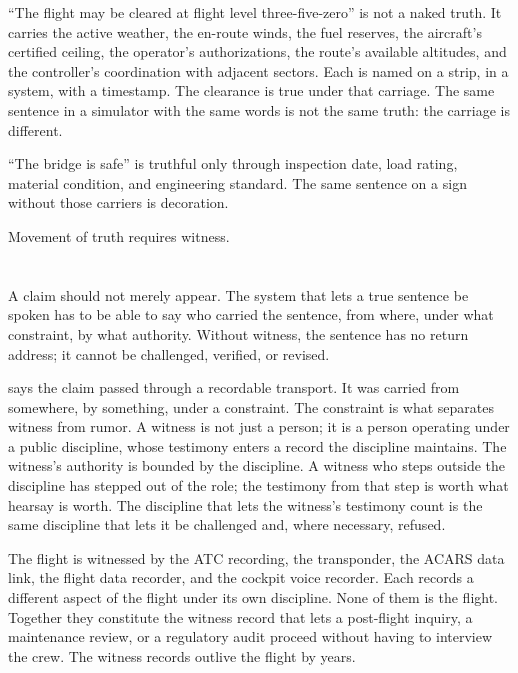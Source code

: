 ``The flight may be cleared at flight level three-five-zero'' is not a
naked truth. It carries the active weather, the en-route winds, the
fuel reserves, the aircraft's certified ceiling, the operator's
authorizations, the route's available altitudes, and the controller's
coordination with adjacent sectors. Each is named on a strip, in a
system, with a timestamp. The clearance is true under that carriage.
The same sentence in a simulator with the same words is not the same
truth: the carriage is different.

``The bridge is safe'' is truthful only through inspection date, load
rating, material condition, and engineering standard. The same
sentence on a sign without those carriers is decoration.

Movement of truth requires witness.

\section{}
\label{se:witnessed}

A claim should not merely appear. The system that lets a true sentence
be spoken has to be able to say who carried the sentence, from where,
under what constraint, by what authority. Without witness, the
sentence has no return address; it cannot be challenged, verified, or
revised.

 says the claim passed through a recordable transport.
It was carried from somewhere, by something, under a constraint. The
constraint is what separates witness from rumor. A witness is not just
a person; it is a person operating under a public discipline, whose
testimony enters a record the discipline maintains. The witness's
authority is bounded by the discipline. A witness who steps outside
the discipline has stepped out of the role; the testimony from that
step is worth what hearsay is worth. The discipline that lets the
witness's testimony count is the same discipline that lets it be
challenged and, where necessary, refused.

The flight is witnessed by the ATC recording, the transponder, the
ACARS data link, the flight data recorder, and the cockpit voice
recorder. Each records a different aspect of the flight under its own
discipline. None of them is the flight. Together they constitute the
witness record that lets a post-flight inquiry, a maintenance review,
or a regulatory audit proceed without having to interview the crew.
The witness records outlive the flight by years.


